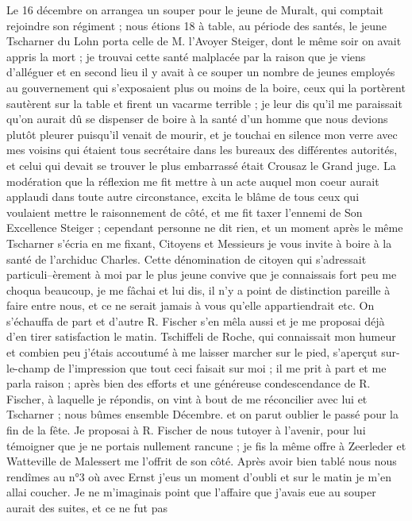 \documentclass[12pt]{article}
\begin{document}
 Le 16 décembre on arrangea un souper pour le
jeune de Muralt, qui comptait rejoindre son régiment ; nous étions 18 à table, au période des
santés, le jeune Tscharner du Lohn porta celle de M. l’Avoyer Steiger, dont le même soir on avait
appris la mort ; je trouvai cette santé malplacée par la raison que je viens d’alléguer et en second
lieu il y avait à ce souper un nombre de jeunes employés au gouvernement qui s’exposaient plus ou
moins de la boire, ceux qui la portèrent sautèrent sur la table et firent un vacarme terrible ; je
leur dis qu’il me paraissait qu’on aurait dû se dispenser de boire à la santé d’un homme que nous
devions plutôt pleurer puisqu’il venait de mourir, et je touchai en silence mon verre avec mes
voisins qui étaient tous secrétaire dans les bureaux des différentes autorités, et celui qui devait
se trouver le plus embarrassé était Crousaz le Grand juge. La modération que la réflexion me fit
mettre à un acte auquel mon coeur aurait applaudi dans toute autre circonstance, excita le blâme de
tous ceux qui voulaient mettre le raisonnement de côté, et me fit taxer l’ennemi de Son Excellence
Steiger ; cependant personne ne dit rien, et un moment après le même Tscharner s’écria en me fixant,
Citoyens et Messieurs je vous invite à boire à la santé de l’archiduc Charles. Cette dénomination de
citoyen qui s’adressait particuli–èrement à moi par le plus jeune convive que je connaissais fort
peu me choqua beaucoup, je me fâchai et lui dis, il n’y a point de distinction pareille à faire
entre nous, et ce ne serait jamais à vous qu’elle appartiendrait etc. On s’échauffa de part et
d’autre R. Fischer s’en mêla aussi et je me proposai déjà d’en tirer satisfaction le matin.
Tschiffeli de Roche, qui connaissait mon humeur et combien peu j’étais accoutumé à me laisser
marcher sur le pied, s’aperçut sur-le-champ de l’impression que tout ceci faisait sur moi ; il me
prit à part et me parla raison ; après bien des efforts et une généreuse condescendance de R.
Fischer, à laquelle je répondis, on vint à bout de me réconcilier avec lui et Tscharner ; nous bûmes
ensemble Décembre. et on parut oublier le passé pour la fin de la fête. Je proposai à R. Fischer de
nous tutoyer à l’avenir, pour lui témoigner que je ne portais nullement rancune ; je fis la même
offre à Zeerleder et Watteville de Malessert me l’offrit de son côté. Après avoir bien tablé nous
nous rendîmes au n°3 où avec Ernst j’eus un moment d’oubli et sur le matin je m’en allai coucher. Je
ne m’imaginais point que l’affaire que j’avais eue au souper aurait des suites, et ce ne fut pas
\end{document}
